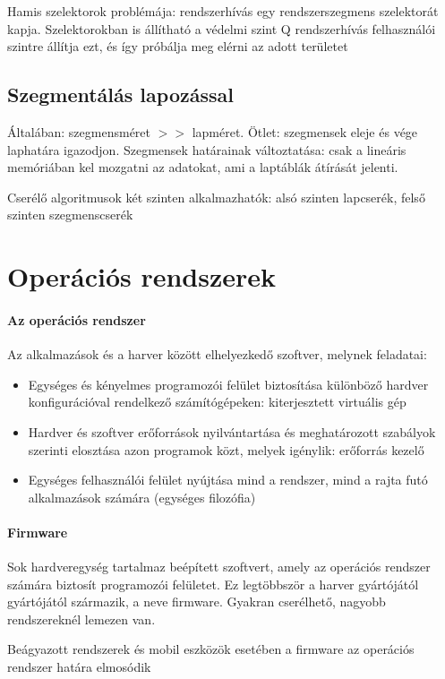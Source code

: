 \documentclass[fleqn,10pt,a4paper]{article}
\theoremstyle{magyar}
\begin{document}
  Hamis szelektorok problémája: rendszerhívás egy rendszerszegmens szelektorát kapja. Szelektorokban is állítható a
  védelmi szint Q rendszerhívás felhasználói szintre állítja ezt, és így próbálja meg elérni az adott területet


  \subsection{Szegmentálás lapozással}  
  Általában: szegmensméret $>>$ lapméret. Ötlet: szegmensek eleje és vége laphatára igazodjon.
  Szegmensek határainak változtatása: csak a lineáris memóriában kel mozgatni az adatokat, ami a laptáblák átírását
  jelenti.
  
  Cserélő algoritmusok két szinten alkalmazhatók: alsó szinten lapcserék, felső szinten  szegmenscserék
  


  \newpage
  \section{Operációs rendszerek}
  \paragraph{Az operációs rendszer}
  Az alkalmazások és a harver között elhelyezkedő szoftver, melynek feladatai:
  \begin{itemize}
  \item Egységes és kényelmes programozói felület biztosítása különböző hardver konfigurációval rendelkező számítógépeken: kiterjesztett virtuális gép 
  \item Hardver és szoftver erőforrások nyilvántartása és meghatározott szabályok szerinti elosztása azon programok közt, melyek igénylik: erőforrás kezelő
  \item Egységes felhasználói felület nyújtása mind a rendszer, mind a rajta futó alkalmazások számára (egységes filozófia)
  \end{itemize}
  
  \paragraph{Firmware}
  Sok hardveregység tartalmaz beépített szoftvert, amely az operációs rendszer számára biztosít programozói
  felületet. Ez legtöbbször a harver gyártójától gyártójától származik, a neve firmware. Gyakran cserélhető, nagyobb
  rendszereknél lemezen van.

  Beágyazott rendszerek és mobil eszközök esetében a firmware az operációs rendszer határa elmosódik
\end{document}
